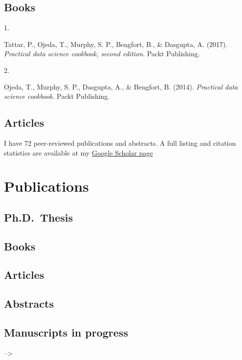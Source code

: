 \documentclass[10pt,letterpaper,]{article}
\newlength{\cslhangindent}
\newlength{\csllabelwidth}
\newenvironment{CSLReferences}[2] %
 {\begin{list}{}{%
  \setlength{\itemindent}{0pt}
  \setlength{\leftmargin}{0pt}
  \setlength{\parsep}{0pt}
  \ifodd #1
   \setlength{\leftmargin}{\cslhangindent}
   \setlength{\itemindent}{-1\cslhangindent}
  \fi
  \setlength{\itemsep}{#2\baselineskip}}}
 {\end{list}}
\newcommand{\CSLLeftMargin}[1]{\parbox[t]{\csllabelwidth}{\strut#1\strut}}
\newcommand{\CSLRightInline}[1]{\parbox[t]{\linewidth - \csllabelwidth}{\strut#1\strut}}
\begin{document}
\subsection{Books}\label{books}

\label{refs-9b1a6c5914c6fcea964e6672e8920d4b}
\begin{CSLReferences}{0}{0}
\CSLLeftMargin{1. }%
\CSLRightInline{Tattar, P., Ojeda, T., Murphy, S. P., Bengfort, B., \&
Dasgupta, A. (2017). \emph{Practical data science cookbook, second
edition}. Packt Publishing.}

\CSLLeftMargin{2. }%
\CSLRightInline{Ojeda, T., Murphy, S. P., Dasgupta, A., \& Bengfort, B.
(2014). \emph{Practical data science cookbook}. Packt Publishing.}

\end{CSLReferences}

\subsection{Articles}\label{articles}

I have 72 peer-reviewed publications and abstracts. A full listing and
citation statistics are available at my
\href{https://scholar.google.com/citations?user=EgaGUCwAAAAJ&hl=en}{Google
Scholar page}\\
\vspace{0.5cm}

\section{Publications}\label{publications-1}

\subsection{Ph.D.~Thesis}\label{ph.d.-thesis-1}

\subsection{Books}\label{books-1}

\subsection{Articles}\label{articles-1}

\subsection{Abstracts}\label{abstracts}

\subsection{Manuscripts in progress}\label{manuscripts-in-progress}

--\textgreater{}
\end{document}
